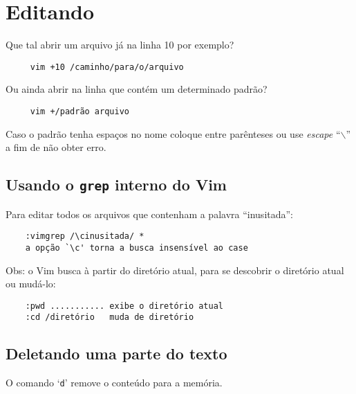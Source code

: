 
\chapter{Editando}
\label{Editando}

Que tal abrir um arquivo já na linha 10 por exemplo?

\begin{verbatim}
     vim +10 /caminho/para/o/arquivo
\end{verbatim}

Ou ainda abrir na linha que contém um determinado padrão?

\begin{verbatim}
     vim +/padrão arquivo
\end{verbatim}

{\Large {}} Caso o padrão tenha espaços no nome coloque entre parênteses ou
use {\em escape} ``$\backslash$'' a fim de não obter erro.

\section{Usando o {\tt grep} interno do Vim}
\label{sec:Usando o grep interno do Vim}

Para editar todos os arquivos que contenham a palavra ``inusitada'':

\begin{verbatim}
    :vimgrep /\cinusitada/ *
    a opção `\c' torna a busca insensível ao case
\end{verbatim}

Obs: o Vim busca à partir do diretório atual, para se descobrir 
o diretório atual ou mudá-lo:

\begin{verbatim}
    :pwd ........... exibe o diretório atual
    :cd /diretório   muda de diretório
\end{verbatim}

\section{Deletando uma parte do texto}\label{Deletando uma parte do texto}

O comando `{\tt d}' remove o conteúdo para a memória.

